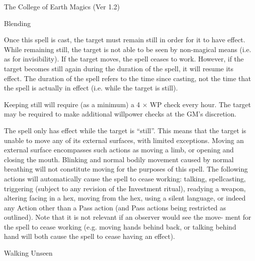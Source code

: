 \begin{Chapter}{The College of Earth Magics (Ver 1.2)}
\begin{spell}[G-4]{Blending}
\begin{effects}
Once this spell is cast, the target must remain still in order for it
to have effect.  While remaining still, the target is not able to be
seen by non-magical means (i.e.  as for invisibility).  If the target
moves, the spell ceases to work. However, if the target becomes still
again during the duration of the spell, it will resume its effect.
The duration of the spell refers to the time since casting, not the
time that the spell is actually in effect (i.e.  while the target is
still).

Keeping still will require (as a minimum) a 4 × WP check every hour.
The target may be required to make additional willpower checks at the
GM’s discretion.

The spell only has effect while the target is “still”.  This means
that the target is unable to move any of its external surfaces, with
limited exceptions. Moving an external surface encompasses such
actions as moving a limb, or opening and closing the mouth.  Blinking
and normal bodily movement caused by normal breathing will not
constitute moving for the purposes of this spell.  The following
actions will automatically cause the spell to cease working: talking,
spellcasting, triggering (subject to any revision of the Investment
ritual), readying a weapon, altering facing in a hex, moving from the
hex, using a silent language, or indeed any Action other than a Pass
action (and Pass actions being restricted as outlined).  Note that it
is not relevant if an observer would see the move- ment for the spell
to cease working (e.g.  moving hands behind back, or talking behind
hand will both cause the spell to cease having an effect).
\end{effects}
\end{spell}

\begin{spell}[G-5]{Walking Unseen}


\end{spell}
\end{Chapter}
